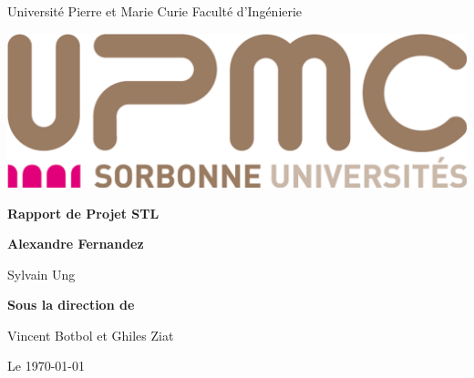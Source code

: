 \begin{titlepage}
\parindent=0pt
Université Pierre et Marie Curie   Faculté d'Ingénierie
\begin{center}
\includegraphics[scale=0.2]{images/logo_upmc.jpg}%
\end{center}
\hrulefill
\begin{center}\bfseries\Huge
  Rapport de Projet STL
\end{center}
\hrulefill
\vspace*{1cm}
\begin{center}\bfseries\Large
Alexandre Fernandez

Sylvain Ung
\end{center}
    
\begin{center}\bfseries\Large
Sous la direction de 

Vincent Botbol et Ghiles Ziat
\end{center}
\begin{flushright}
  Le \today 
\end{flushright}   

\end{titlepage}